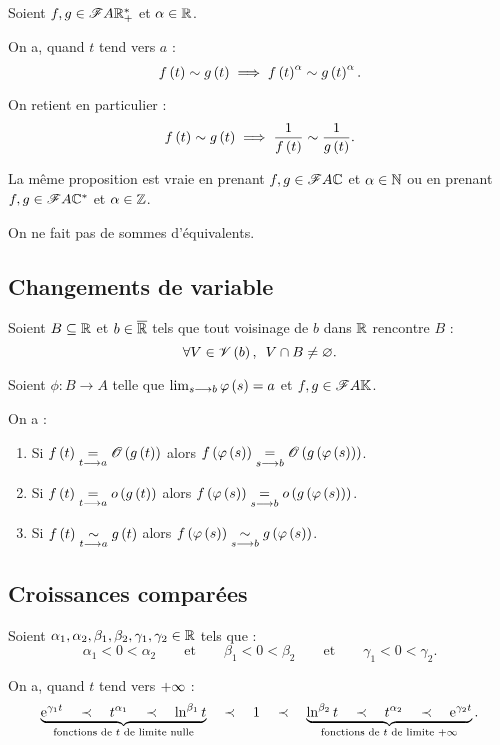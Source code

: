 \begin{prop}[Puissances]
Soient \(f,g\in\mathscr{F}{A}{\mathbb{R}_+^*}\) et \(\alpha\in\mathbb{R}\).

On a, quand \(t\) tend vers \(a\) : \[f\left(t\right)\sim g\left(t\right)\implies f\left(t\right)^\alpha\sim g\left(t\right)^\alpha.\]

On retient en particulier : \[f\left(t\right)\sim g\left(t\right)\implies\dfrac{1}{f\left(t\right)}\sim\dfrac{1}{g\left(t\right)}.\]

La même proposition est vraie en prenant \(f,g\in\mathscr{F}{A}{\mathbb{C}}\) et \(\alpha\in\mathbb{N}\) ou en prenant \(f,g\in\mathscr{F}{A}{\mathbb{C}^*}\) et \(\alpha\in\mathbb{Z}\).
\end{prop}

\begin{prop}[Sommes]
On ne fait pas de sommes d'équivalents.
\end{prop}

\subsection{Changements de variable}

\begin{prop}
Soient \(B\subseteq\mathbb{R}\) et \(b\in\overline{\mathbb{R}}\) tels que tout voisinage de \(b\) dans \(\mathbb{R}\) rencontre \(B\) : \[\quantifs{\forall V\in\V{b}}V\inter B\not=\ensvide.\]

Soient \(\phi:B\to A\) telle que \(\lim_{s\longrightarrow b}\varphi\left(s\right)=a\) et \(f,g\in\mathscr{F}{A}{\mathbb{K}}\).

On a :

\begin{enumerate}
    \item Si \(f\left(t\right)\underset{t\longrightarrow a}{=}\mathscr{O}\left(g\left(t\right)\right)\) alors \(f\left(\varphi\left(s\right)\right)\underset{s\longrightarrow b}{=}\mathscr{O}\left(g\left(\varphi\left(s\right)\right)\right)\). \\
    \item Si \(f\left(t\right)\underset{t\longrightarrow a}{=}o\left(g\left(t\right)\right)\) alors \(f\left(\varphi\left(s\right)\right)\underset{s\longrightarrow b}{=}o\left(g\left(\varphi\left(s\right)\right)\right)\). \\
    \item Si \(f\left(t\right)\underset{t\longrightarrow a}{\sim}g\left(t\right)\) alors \(f\left(\varphi\left(s\right)\right)\underset{s\longrightarrow b}{\sim}g\left(\varphi\left(s\right)\right)\).
\end{enumerate}
\end{prop}

\subsection{Croissances comparées}

\begin{prop}
Soient \(\alpha_1,\alpha_2,\beta_1,\beta_2,\gamma_1,\gamma_2\in\mathbb{R}\) tels que : \[\alpha_1<0<\alpha_2\qquad\text{et}\qquad\beta_1<0<\beta_2\qquad\text{et}\qquad\gamma_1<0<\gamma_2.\]

On a, quand \(t\) tend vers \(+\infty\) : \[\underbrace{\mathrm{e}^{\gamma_1t}\quad\prec\quad t^{\alpha_1}\quad\prec\quad\ln^{\beta_1}t}_{\text{fonctions de }t\text{ de limite nulle}}\quad\prec\quad1\quad\prec\quad\underbrace{\ln^{\beta_2}t\quad\prec\quad t^{\alpha_2}\quad\prec\quad\mathrm{e}^{\gamma_2t}}_{\text{fonctions de }t\text{ de limite }+\infty}.\]
\end{prop}


